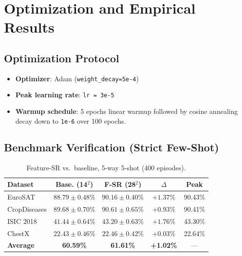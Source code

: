 \documentclass[conference]{IEEEtran}
\begin{document}
\section{Optimization and Empirical Results}

\subsection{Optimization Protocol}
\begin{itemize}
\item \textbf{Optimizer}: Adam (\texttt{weight\_decay=5e-4})
\item \textbf{Peak learning rate}: \texttt{lr = 3e-5}
\item \textbf{Warmup schedule}: 5 epochs linear warmup followed by cosine annealing decay down to \texttt{1e-6} over 100 epochs.
\end{itemize}

\subsection{Benchmark Verification (Strict Few-Shot)}

\begin{table}[t]
\centering
\caption{Feature-SR vs.\ baseline, 5-way 5-shot (400 episodes).}
\label{tab:fsr5shot}
\footnotesize
\setlength{\tabcolsep}{3.5pt}
\begin{tabular}{lcccc}
\toprule
Dataset & Base. (14$^2$) & F-SR (28$^2$) & $\Delta$ & Peak \\
\midrule
EuroSAT       & $88.79{\pm}0.48\%$ & $\mathbf{90.16{\pm}0.40\%}$ & $\mathbf{+1.37\%}$ & 90.43\% \\
CropDiseases  & $89.68{\pm}0.70\%$ & $\mathbf{90.61{\pm}0.65\%}$ & $\mathbf{+0.93\%}$ & 90.41\% \\
ISIC 2018     & $41.44{\pm}0.64\%$ & $\mathbf{43.20{\pm}0.63\%}$ & $\mathbf{+1.76\%}$ & 43.30\% \\
ChestX        & $22.43{\pm}0.46\%$ & $\mathbf{22.46{\pm}0.42\%}$ & $\mathbf{+0.03\%}$ & 22.64\% \\
\midrule
\textbf{Average} & \textbf{60.59\%} & \textbf{61.61\%} & \textbf{+1.02\%} & --- \\
\bottomrule
\end{tabular}
\end{table}
\end{document}
